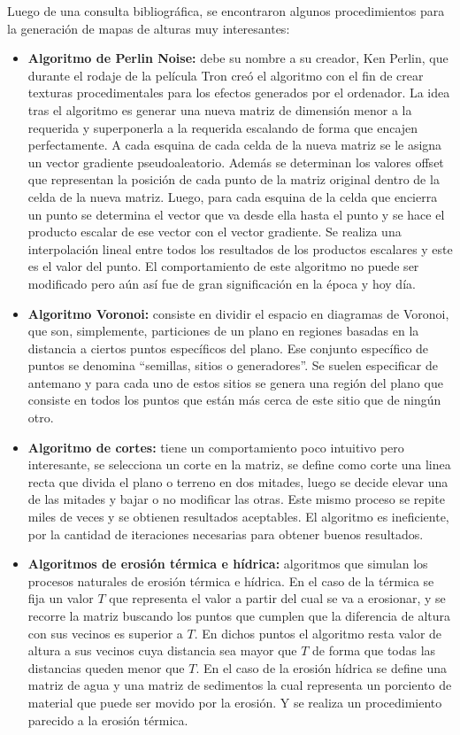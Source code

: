 Luego de una consulta bibliográfica, se encontraron algunos procedimientos para la generación de mapas de alturas muy interesantes:

\begin{itemize}
	\item \textbf{Algoritmo de Perlin Noise:} debe su nombre a su creador, Ken Perlin, que durante el rodaje de la película Tron creó el algoritmo con el fin de crear texturas procedimentales para los efectos generados por el ordenador. La idea tras el algoritmo es generar una nueva matriz de dimensión menor a la requerida y superponerla a la requerida escalando de forma que encajen perfectamente. A cada esquina de cada celda de la nueva matriz se le asigna un vector gradiente pseudoaleatorio. Además se determinan los valores offset que representan la posición de cada punto de la matriz original dentro de la celda de la nueva matriz. Luego, para cada esquina de la celda que encierra un punto se determina el vector que va desde ella hasta el punto y se hace el producto escalar de ese vector con el vector gradiente. Se realiza una interpolación lineal entre todos los resultados de los productos escalares y este es el valor del punto. El comportamiento de este algoritmo no puede ser modificado pero aún así fue de gran significación en la época y hoy día.
	\item \textbf{Algoritmo Voronoi:} consiste en dividir el espacio en diagramas de Voronoi, que son, simplemente, particiones de un plano en regiones basadas en la 	distancia a ciertos puntos específicos del plano. Ese conjunto específico de puntos 	se denomina ``semillas, sitios o generadores''. Se suelen especificar de antemano y 	para cada uno de estos sitios se genera una región del plano que consiste en todos 	los puntos que están más cerca de este sitio que de ningún otro. 
	\item \textbf{Algoritmo de cortes:} tiene un comportamiento poco intuitivo pero interesante, se selecciona un corte en la matriz, se define como corte una linea recta que divida el plano o terreno en dos mitades, luego se decide elevar  una de las mitades y bajar o no modificar las otras. Este mismo proceso se repite miles de veces y se obtienen resultados aceptables. El algoritmo es ineficiente, por la cantidad de iteraciones necesarias para obtener buenos resultados.
	\item \textbf{Algoritmos de erosión térmica e hídrica:} algoritmos que simulan los procesos naturales de erosión térmica e hídrica. En el caso de la térmica se fija un valor $T$ que representa el valor a partir del cual se va a erosionar, y se recorre la matriz buscando los puntos que cumplen que la diferencia de altura con sus vecinos es superior a $T$. En dichos puntos el algoritmo resta valor de altura a sus vecinos cuya distancia sea mayor que $T$ de forma que todas las distancias queden menor que $T$. En el caso de la erosión hídrica se define una matriz de agua y una matriz de sedimentos la cual representa un porciento de material que puede ser movido por la erosión. Y se realiza un procedimiento parecido a la erosión térmica.
\end{itemize}


